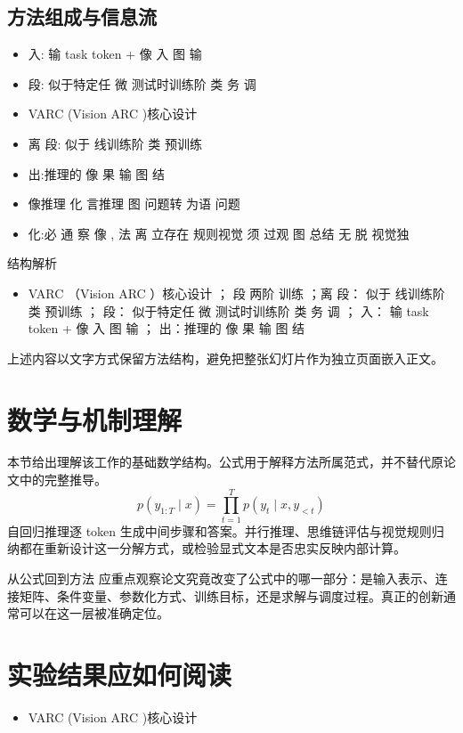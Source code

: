 \documentclass[UTF8,11pt,a4paper]{ctexart}
\begin{document}
\subsection{方法组成与信息流}
\begin{itemize}
\item 入: 输 task token + 像 入 图 输
\item 段: 似于特定任 微 测试时训练阶 类 务 调
\item VARC (Vision ARC )核心设计
\item 离 段: 似于 线训练阶 类 预训练
\item 出:推理的 像 果 输 图 结
\item 像推理 化 言推理 图 问题转 为语 问题
\item 化:必 通 察 像 , 法 离 立存在 规则视觉 须 过观 图 总结 无 脱 视觉独
\end{itemize}

\begin{keybox}{结构解析}
\begin{itemize}
\item VARC （Vision ARC ）核心设计 ； 段 两阶 训练 ；离 段： 似于 线训练阶 类 预训练 ； 段： 似于特定任 微 测试时训练阶 类 务 调 ； 入： 输 task token + 像 入 图 输 ； 出：推理的 像 果 输 图 结
\end{itemize}
\end{keybox}

上述内容以文字方式保留方法结构，避免把整张幻灯片作为独立页面嵌入正文。

\section{数学与机制理解}
本节给出理解该工作的基础数学结构。公式用于解释方法所属范式，并不替代原论文中的完整推导。
\begin{equation}
p(y_{1:T}\mid x)=\prod_{t=1}^{T}p(y_t\mid x,y_{<t})
\end{equation}
自回归推理逐 token 生成中间步骤和答案。并行推理、思维链评估与视觉规则归纳都在重新设计这一分解方式，或检验显式文本是否忠实反映内部计算。

\begin{keybox}{从公式回到方法}
应重点观察论文究竟改变了公式中的哪一部分：是输入表示、连接矩阵、条件变量、参数化方式、训练目标，还是求解与调度过程。真正的创新通常可以在这一层被准确定位。
\end{keybox}


\section{实验结果应如何阅读}
\begin{itemize}
\item VARC (Vision ARC )核心设计
\end{itemize}
\end{document}

